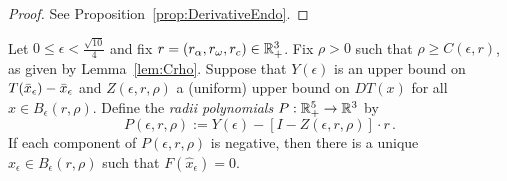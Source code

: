 \begin{proof}
See Proposition~\ref{prop:DerivativeEndo}.
\end{proof}


\begin{theorem}
	\label{thm:RadPoly}
	Let  
 $0 \leq \epsilon < \tfrac{\sqrt{10}}{4} $  
 and fix $r = (r_\alpha, r_\omega, r_c) \in \mathbb{R}^3_+$. Fix $\rho > 0$ such that $ \rho \geq C(\epsilon,r)$, as given by Lemma~\ref{lem:Crho}.
%
Suppose that $Y(\epsilon) $ is an upper bound on $ T(\bar{x}_\epsilon) - \bar{x}_\epsilon$ and $Z(\epsilon , r ,\rho) $ a (uniform) upper bound on $ DT(x) $ for all $ x \in B_\epsilon(r,\rho)$. 
Define the \emph{radii polynomials}
$P :\mathbb{R}^5_+ \to \mathbb{R}^3 $  by 
 \begin{equation}
 \label{eq:RadPolyDef}
  P(\epsilon,r,\rho) := Y(\epsilon) - \left[ I - Z( \epsilon,r,\rho) \right] \cdot r  \,  .
 \end{equation}
If each component of $P(\epsilon,r,\rho)$ is negative, then there is  a unique $\hat{x}_\epsilon \in B_\epsilon( r , \rho)$ such that $F(\hat{x}_\epsilon) =0$. 
\end{theorem}

